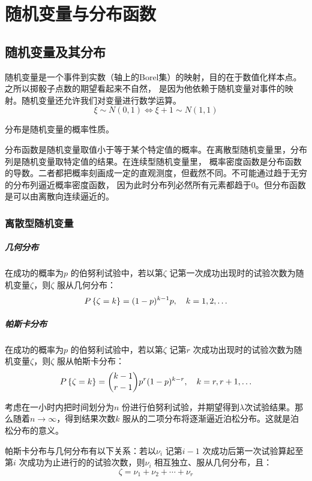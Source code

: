 \chapter{随机变量与分布函数}
\section{随机变量及其分布
}
随机变量是一个事件到实数（轴上的Borel集）的映射，目的在于数值化样本点。之所以掷骰子点数的期望看起来不自然，
是因为他依赖于随机变量对事件的映射。随机变量还允许我们对变量进行数学运算。\[
    \xi \sim N(0,1) \iff \xi+1 \sim N(1,1)
\]

分布是随机变量的概率性质。

分布函数是随机变量取值小于等于某个特定值的概率。在离散型随机变量里，分布列是随机变量取特定值的结果。在连续型随机变量里，
概率密度函数是分布函数的导数。二者都把概率刻画成一定的直观测度，但截然不同。不可能通过趋于无穷的分布列逼近概率密度函数，
因为此时分布列必然所有元素都趋于0。但分布函数是可以由离散向连续逼近的。


\subsection{离散型随机变量}
\paragraph{几何分布} 在成功的概率为\(p\) 的伯努利试验中，若以第\(\zeta\)
记第一次成功出现时的试验次数为随机变量\(\zeta\)，则\(\zeta\) 服从几何分布：
\[
    \P{\zeta=k} = (1-p)^{k-1} p, \quad k=1,2,\ldots
\]

\paragraph{帕斯卡分布} 在成功的概率为\(p\) 的伯努利试验中，若以第\(\zeta\) 记第\(r\)
次成功出现时的试验次数为随机变量\(\zeta\)，则\(\zeta\) 服从帕斯卡分布：
\[
    \P{\zeta=k} = \binom{k-1}{r-1} p^r
    (1-p)^{k-r}, \quad k=r,r+1,\ldots
\]

考虑在一小时内把时间划分为\(n\) 份进行伯努利试验，并期望得到\(\lambda\)次试验结果。那么随着\(n
\to \infty\)，得到结果次数\(k\) 服从的二项分布将逐渐逼近泊松分布。这就是泊松分布的意义。

帕斯卡分布与几何分布有以下关系：若以\(\nu_{i}\) 记第\(i-1\) 次成功后第一次试验算起至第\(i\)
次成功为止进行的的试验次数，则\(\nu_{i}\) 相互独立、服从几何分布，且：
\[
    \zeta = \nu_{1} + \nu_{2} + \cdots + \nu_{r}
\]

